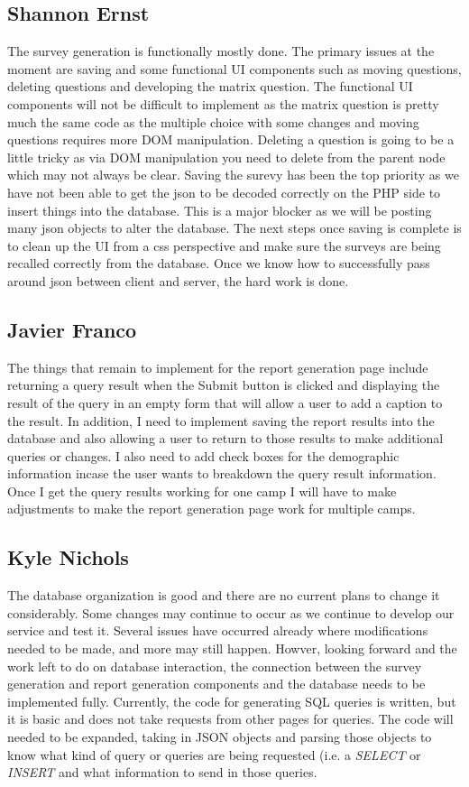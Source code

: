 \documentclass[letterpaper,10pt,serif, draftclsnofoot,onecolumn, compsoc, titlepage]{IEEEtran}
\begin{document}
\subsection{Shannon Ernst}

The survey generation is functionally mostly done. The primary issues at the moment are saving and some functional UI components
such as moving questions, deleting questions and developing the matrix question. The functional UI components will not be difficult to implement as the matrix question is pretty much the same code as the multiple choice with some changes and moving questions requires more DOM manipulation. Deleting a question is going to be a little tricky as via DOM manipulation you need to delete from 
the parent node which may not always be clear. Saving the surevy has been the top priority as we have not been able to get the 
json to be decoded correctly on the PHP side to insert things into the database. This is a major blocker as we will be posting many 
json objects to alter the database. The next steps once saving is complete is to clean up the UI from a css perspective and make sure the surveys are being recalled 
correctly from the database. Once we know how to successfully pass around json between client and server, the hard work is done.
\subsection{Javier Franco}
The things that remain to implement for the report generation page include returning a query result when the Submit button is clicked and displaying the result of the query in an empty form that will allow a user to add a caption to the result.  In addition, I need to implement saving the report results into the database and also allowing a user to return to those results to make additional queries or changes. I also need to add check boxes for the demographic information incase the user wants to breakdown the query result information. Once I get the query results working for one camp I will have to make adjustments to make the report generation page work for multiple camps. 

\subsection{Kyle Nichols}
The database organization is good and there are no current plans to change it considerably.
Some changes may continue to occur as we continue to develop our service and test it.
Several issues have occurred already where modifications needed to be made, and more may still happen.
Howver, looking forward and the work left to do on database interaction, the connection between the survey generation and report generation components and the database needs to be implemented fully.
Currently, the code for generating SQL queries is written, but it is basic and does not take requests from other pages for queries.
The code will needed to be expanded, taking in JSON objects and parsing those objects to know what kind of query or queries are being requested (i.e. a \emph{SELECT} or \emph{INSERT} and what information to send in those queries.
\end{document}
